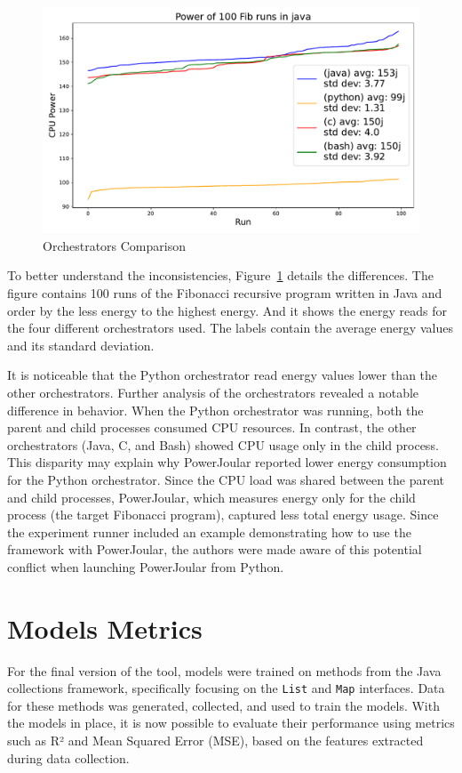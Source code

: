 \begin{figure}[htbp]
  \centering
  \includegraphics[width = .8 \textwidth]{figures/4_orchs_comparison.pdf}
  \caption{Orchestrators Comparison}
  \label{fig:4_orchs_comparison}
\end{figure}

To better understand the inconsistencies, Figure~\ref{fig:4_orchs_comparison} details the differences.
The figure contains 100 runs of the Fibonacci recursive program written in Java and order by the less energy to the highest energy. And it shows the energy reads for the four different orchestrators used. The labels contain the average energy values and its standard deviation.

It is noticeable that the Python orchestrator read energy values lower than the other orchestrators. Further analysis of the orchestrators revealed a notable difference in behavior. When the Python orchestrator was running, both the parent and child processes consumed CPU resources. In contrast, the other orchestrators (Java, C, and Bash) showed CPU usage only in the child process. This disparity may explain why PowerJoular reported lower energy consumption for the Python orchestrator. Since the CPU load was shared between the parent and child processes, PowerJoular, which measures energy only for the child process (the target Fibonacci program), captured less total energy usage.
Since the experiment runner included an example demonstrating how to use the framework with PowerJoular, the authors were made aware of this potential conflict when launching PowerJoular from Python.


\section{Models Metrics} \label{sec:models_metrics}

For the final version of the tool, models were trained on methods from the Java collections framework, specifically focusing on the \texttt{List} and \texttt{Map} interfaces. Data for these methods was generated, collected, and used to train the models. With the models in place, it is now possible to evaluate their performance using metrics such as R² and Mean Squared Error (MSE), based on the features extracted during data collection.

